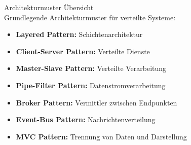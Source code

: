 \begin{concept}{Architekturmuster Übersicht}\\
Grundlegende Architekturmuster für verteilte Systeme:
\begin{itemize}
    \item \textbf{Layered Pattern:} Schichtenarchitektur
    \item \textbf{Client-Server Pattern:} Verteilte Dienste
    \item \textbf{Master-Slave Pattern:} Verteilte Verarbeitung
    \item \textbf{Pipe-Filter Pattern:} Datenstromverarbeitung
    \item \textbf{Broker Pattern:} Vermittler zwischen Endpunkten
    \item \textbf{Event-Bus Pattern:} Nachrichtenverteilung
    \item \textbf{MVC Pattern:} Trennung von Daten und Darstellung
\end{itemize}
\end{concept}

